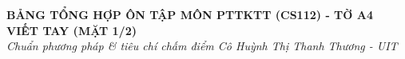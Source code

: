 \documentclass[9pt,a4paper]{article}
\begin{document}
\setlength{\abovedisplayskip}{2pt}\setlength{\belowdisplayskip}{2pt}
\setlength{\abovedisplayshortskip}{1pt}\setlength{\belowdisplayshortskip}{1pt}

\begin{center}
  \textbf{\large BẢNG TỔNG HỢP ÔN TẬP MÔN PTTKTT (CS112) - TỜ A4 VIẾT TAY (MẶT 1/2)}\\
  \small \textit{Chuẩn phương pháp \& tiêu chí chấm điểm Cô Huỳnh Thị Thanh Thương - UIT}
\end{center}
\vspace{-4pt}
\end{document}
